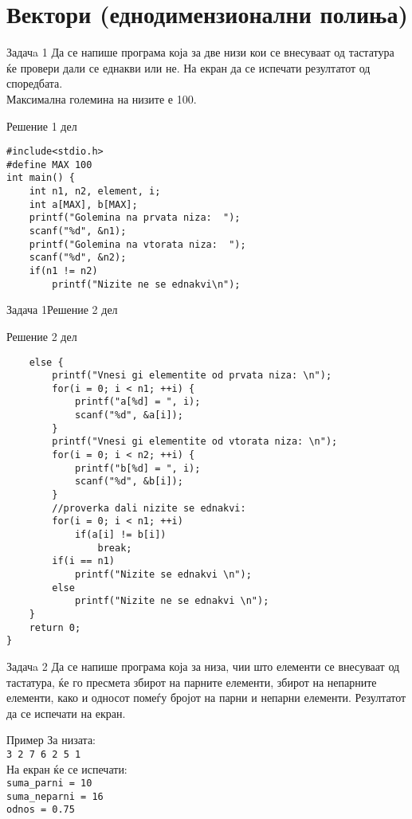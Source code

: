 \section{Вектори (еднодимензионални полиња)}

\begin{frame}[fragile]{Задачa 1}
Да се напише програма која за две низи кои се внесуваат од тастатура ќе провери
дали се еднакви или не. На екран да се испечати резултатот од споредбата.\\
Максимална големина на низите е 100.
\pause
\begin{exampleblock}{Решение 1 дел}
\begin{lstlisting}
#include<stdio.h>
#define MAX 100
int main() {
    int n1, n2, element, i;
    int a[MAX], b[MAX];
    printf("Golemina na prvata niza:  ");
    scanf("%d", &n1);
    printf("Golemina na vtorata niza:  ");
    scanf("%d", &n2);
    if(n1 != n2)
        printf("Nizite ne se ednakvi\n");
\end{lstlisting}
\end{exampleblock}
\end{frame}

\begin{frame}[fragile]{Задача 1}{Решение 2 дел}
\begin{exampleblock}{Решение 2 дел}
\begin{lstlisting}
    else {
        printf("Vnesi gi elementite od prvata niza: \n");
        for(i = 0; i < n1; ++i) {
            printf("a[%d] = ", i);
            scanf("%d", &a[i]);
        }
        printf("Vnesi gi elementite od vtorata niza: \n");
        for(i = 0; i < n2; ++i) {
            printf("b[%d] = ", i);            
            scanf("%d", &b[i]);
        }
        //proverka dali nizite se ednakvi:
        for(i = 0; i < n1; ++i)
            if(a[i] != b[i])
                break;
        if(i == n1)
            printf("Nizite se ednakvi \n");
        else
            printf("Nizite ne se ednakvi \n");    
    }
    return 0;
}
\end{lstlisting}
\end{exampleblock}
\end{frame}


\begin{frame}{Задачa 2}
Да се напише програма која за низа, чии што елементи се внесуваат од тастатура, ќе го пресмета збирот на парните елементи, 
збирот на непарните елементи, како и односот помеѓу бројот на парни и непарни елементи. Резултатот да се испечати на екран.
\begin{exampleblock}{Пример}
За низата:\\
\texttt{3 {\color{red}2} 7 {\color{red}6} {\color{red}2} 5 1}\\
На екран ќе се испечати: \\
\texttt{suma\_parni = 10}\\
\texttt{suma\_neparni = 16}\\
\texttt{odnos = 0.75}
\end{exampleblock}
\end{frame}

